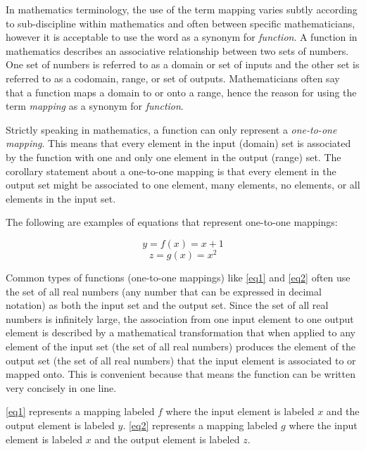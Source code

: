 In mathematics terminology, the use of the term mapping varies subtly according to sub-discipline within mathematics and often between specific mathematicians, however it is acceptable to use the word as a synonym for \emph{function}. A function in mathematics describes an associative relationship between two sets of numbers. One set of numbers is referred to as a domain or set of inputs and the other set is referred to as a codomain, range, or set of outputs. Mathematicians often say that a function maps a domain to or onto a range, hence the reason for using the term \emph{mapping} as a synonym for \emph{function}.

Strictly speaking in mathematics, a function can only represent a \emph{one-to-one mapping}. This means that every element in the input (domain) set is associated by the function with one and only one element in the output (range) set. The corollary statement about a one-to-one mapping is that every element in the output set might be associated to one element, many elements, no elements, or all elements in the input set.

The following are examples of equations that represent one-to-one mappings:

\begin{equation} \label{eq1}
y = f(x) = x + 1
\end{equation}
\begin{equation} \label{eq2}
z = g(x) = x^{2}
\end{equation}

Common types of functions (one-to-one mappings) like \ref{eq1} and \ref{eq2} often use the set of all real numbers (any number that can be expressed in decimal notation) as both the input set and the output set. Since the set of all real numbers is infinitely large, the association from one input element to one output element is described by a mathematical transformation that when applied to any element of the input set (the set of all real numbers) produces the element of the output set (the set of all real numbers) that the input element is associated to or mapped onto. This is convenient because that means the function can be written very concisely in one line. 

\ref{eq1} represents a mapping labeled \begin{math}f\end{math} where the input element is labeled \begin{math}x\end{math} and the output element is labeled \begin{math}y\end{math}. \ref{eq2} represents a mapping labeled \begin{math}g\end{math} where the input element is labeled \begin{math}x\end{math} and the output element is labeled \begin{math}z\end{math}.

